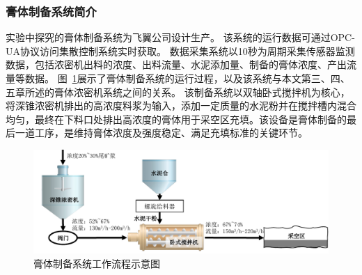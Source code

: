 \subsubsection{膏体制备系统简介}
实验中探究的膏体制备系统为飞翼公司设计生产。
该系统的运行数据可通过OPC-UA协议访问集散控制系统实时获取。
数据采集系统以10秒为周期采集传感器监测数据，包括浓密机出料的浓度、出料流量、水泥添加量、制备的膏体浓度、产出流量等数据。
图~\ref{fig:paste_system}展示了膏体制备系统的运行过程，以及该系统与本文第三、四、五章所述的膏体浓密机系统之间的关系。
该制备系统以双轴卧式搅拌机为核心，将深锥浓密机排出的高浓度料浆为输入，添加一定质量的水泥粉并在搅拌槽内混合均匀，最终在下料口处排出高浓度的膏体用于采空区充填。该设备是膏体制备的最后一道工序，是维持膏体浓度及强度稳定、满足充填标准的关键环节。

\begin{figure}[!htbp]
  \centering
  \includegraphics[width=\textwidth]{figures/chapter4/paste_system.pdf}
  \caption{膏体制备系统工作流程示意图}
\label{fig:paste_system} 
\end{figure}

